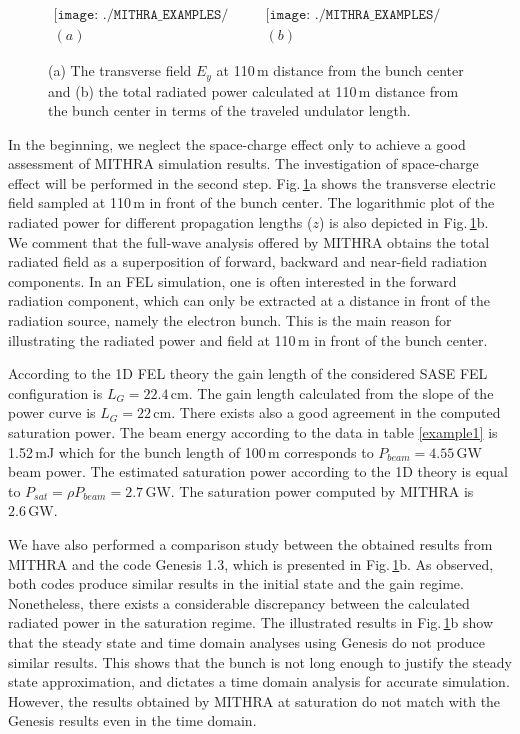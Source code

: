 \begin{figure}
	\centering
	$\begin{array}{cc}
	\texttt{[image: ./MITHRA\_EXAMPLES/Fig1/Fig1a.pdf]} & \texttt{[image: ./MITHRA\_EXAMPLES/Fig1/Fig1b.pdf]} \\
	(a) & (b)
	\end{array}$
	\caption{(a) The transverse field $E_y$ at 110\,{\textmu}m distance from the bunch center and (b) the total radiated power calculated at 110\,{\textmu}m distance from the bunch center in terms of the traveled undulator length.}
	\label{power-example1}
\end{figure}
%
In the beginning, we neglect the space-charge effect only to achieve a good assessment of MITHRA simulation results.
%
The investigation of space-charge effect will be performed in the second step.
%
Fig.\,\ref{power-example1}a shows the transverse electric field sampled at 110\,{\textmu}m in front of the bunch center.
%
The logarithmic plot of the radiated power for different propagation lengths ($z$) is also depicted in Fig.\,\ref{power-example1}b.
%
We comment that the full-wave analysis offered by MITHRA obtains the total radiated field as a superposition of forward, backward and near-field radiation components.
%
In an FEL simulation, one is often interested in the forward radiation component, which can only be extracted at a distance in front of the radiation source, namely the electron bunch.
%
This is the main reason for illustrating the radiated power and field at 110\,{\textmu}m in front of the bunch center.

According to the 1D FEL theory the gain length of the considered SASE FEL configuration is $L_G=22.4\,\mathrm{cm}$.
%
The gain length calculated from the slope of the power curve is $L_G=22\,\mathrm{cm}$.
%
There exists also a good agreement in the computed saturation power.
%
The beam energy according to the data in table \ref{example1} is 1.52\,mJ which for the bunch length of 100\,{\textmu}m corresponds to $P_{beam}=4.55\,\mathrm{GW}$ beam power.
%
The estimated saturation power according to the 1D theory is equal to $P_{sat} = \rho P_{beam} = 2.7\,\mathrm{GW}$.
%
The saturation power computed by MITHRA is $2.6\,\mathrm{GW}$.

We have also performed a comparison study between the obtained results from MITHRA and the code Genesis 1.3, which is presented in Fig.\,\ref{power-example1}b.
%
As observed, both codes produce similar results in the initial state and the gain regime.
%
Nonetheless, there exists a considerable discrepancy between the calculated radiated power in the saturation regime.
%
The illustrated results in Fig.\,\ref{power-example1}b show that the steady state and time domain analyses using Genesis do not produce similar results.
%
This shows that the bunch is not long enough to justify the steady state approximation, and dictates a time domain analysis for accurate simulation.
%
However, the results obtained by MITHRA at saturation do not match with the Genesis results even in the time domain.

